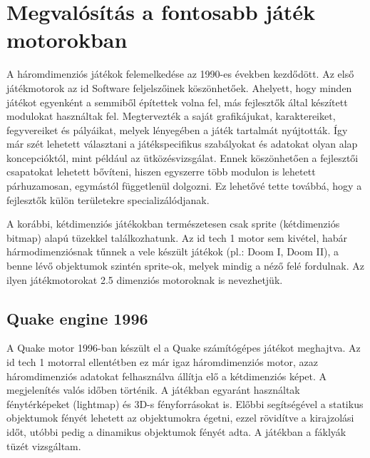 

\section{Megvalósítás a fontosabb játék motorokban}

A háromdimenziós játékok felemelkedése az 1990-es években kezdődött. Az első játékmotorok az id Software feljelszőinek köszönhetőek. Ahelyett, hogy minden játékot egyenként a semmiből építettek volna fel, más fejlesztők által készített modulokat használtak fel. Megtervezték a saját grafikájukat, karaktereiket, fegyvereiket és pályáikat, melyek lényegében a játék tartalmát nyújtották. Így már szét lehetett választani a játékspecifikus szabályokat és adatokat olyan alap koncepcióktól, mint például az ütközésvizsgálat. Ennek köszönhetően a fejlesztői csapatokat lehetett bővíteni, hiszen egyszerre több modulon is lehetett párhuzamosan, egymástól függetlenül dolgozni. Ez lehetővé tette továbbá, hogy a fejlesztők külön területekre specializálódjanak.
\cite{wikiGameEngine}

A korábbi, kétdimenziós játékokban természetesen csak sprite (kétdimenziós bitmap) alapú tüzekkel találkozhatunk. Az id tech 1 motor sem kivétel, habár hármodimenziósnak tűnnek a vele készült játékok (pl.: Doom I, Doom II), a benne lévő objektumok szintén sprite-ok, melyek mindig a néző felé fordulnak. Az ilyen játékmotorokat 2.5 dimenziós motoroknak is nevezhetjük. 



\subsection{Quake engine 1996}
A Quake motor 1996-ban készült el a Quake számítógépes játékot meghajtva. Az id tech 1 motorral ellentétben ez már igaz háromdimenziós motor, azaz háromdimenziós adatokat felhasználva állítja elő a kétdimenziós képet. A megjelenítés valós időben történik. A játékban egyaránt használtak fénytérképeket (lightmap) és 3D-s fényforrásokat is. Előbbi segítségével a statikus objektumok fényét lehetett az objektumokra égetni, ezzel rövidítve a kirajzolási időt, utóbbi pedig a dinamikus objektumok fényét adta. \cite{wikiQuake} A játékban a fáklyák tüzét vizsgáltam.

